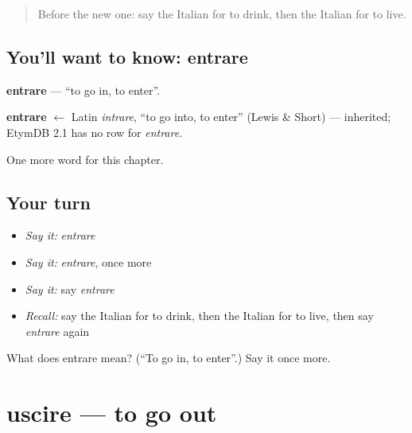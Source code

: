 \label{lesson:IT-C50-entrare}



\begin{quote}
Before the new one: say the Italian for to drink, then the Italian for to live.
\end{quote}

\subsection*{You'll want to know: entrare}
\textbf{entrare} — \textquotedblleft{}to go in, to enter\textquotedblright{}.

\begin{cousinweb}
\textbf{entrare} $\leftarrow$ Latin \emph{intrare}, \textquotedblleft{}to go into, to enter\textquotedblright{} (Lewis \& Short) — inherited; EtymDB 2.1 has no row for \emph{entrare}.
\end{cousinweb}

\begin{grammarlens}[title={What you've built}]
One more word for this chapter.
\end{grammarlens}

\subsection*{Your turn}
\begin{itemize}
\raggedright
  \item \emph{Say it:} \emph{entrare}
  \item \emph{Say it:} \emph{entrare}, once more
  \item \emph{Say it:} say \emph{entrare}
  \item \emph{Recall:} say the Italian for to drink, then the Italian for to live, then say \emph{entrare} again
\end{itemize}

\begin{tcolorbox}[breakable,colback=teal!4,colframe=teal!35!black,title={Before you move on}]
What does entrare mean? (\textquotedblleft{}To go in, to enter\textquotedblright{}.) Say it once more.
\end{tcolorbox}
\section[uscire]{uscire — to go out}

\label{lesson:IT-C50-uscire}



